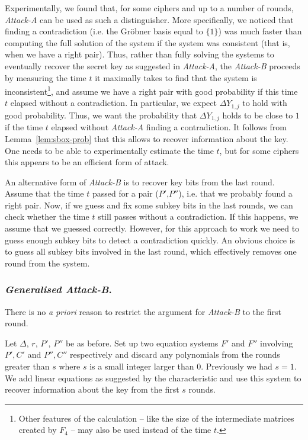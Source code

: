 Experimentally, we found that, for some ciphers and up to a number of rounds, \emph{Attack-A} can be used as such a distinguisher. More specifically, we
noticed that finding a contradiction (i.e. the Gr\"obner basis equal to $\{1\}$) was much faster than computing the full solution of the system if the system was consistent (that is, when we have a right pair).  Thus, rather than fully solving the systems to eventually recover the secret key as suggested in \emph{Attack-A}, the \emph{Attack-B} proceeds by measuring the time $t$ it maximally takes to find that the system is inconsistent\footnote{Other features of the calculation -- like the size of the intermediate matrices created by $F_4$ -- may also be used instead of the time $t$.}, and assume we have a right pair with good probability if this time $t$ elapsed without a contradiction. In particular, we expect $\Delta Y_{1,j}$ to hold with good probability. Thus, we want the probability that $\Delta Y_{1,j}$ holds to be close to $1$ if the time $t$ elapsed without \emph{Attack-A} finding a contradiction. It follows from Lemma~\ref{lem:sbox-prob} that this allows to recover information about the key. One needs to be able to experimentally estimate the time $t$, but for some ciphers this appears to be an efficient form of attack.

An alternative form of \emph{Attack-B} is to recover key bits from the last round. Assume that the time $t$ passed for a pair ($P'$,$P''$), i.e. that we probably found a right pair. Now, if we guess and fix some subkey bits in the last rounds, we can check whether the time $t$ still passes without a contradiction. If this happens, we assume that we guessed correctly. However, for this approach to work we need to guess enough subkey bits to detect a
contradiction quickly. An obvious choice is to guess all subkey bits involved in the last round, which effectively removes one round from the system.

\subsubsection{\emph{Generalised Attack-B}.}

There is no \emph{a priori} reason to restrict the argument for \emph{Attack-B} to the first round.

Let $\Delta$, $r$, $P'$, $P''$ be as before. Set up two equation systems $F'$ and $F''$ involving $P',C'$ and $P'',C''$ respectively and discard any polynomials from the rounds greater than $s$ where $s$ is a small integer larger than $0$. Previously we had $s=1$. We add linear equations as suggested by the characteristic and use this system to recover information about the key from the first $s$ rounds.

